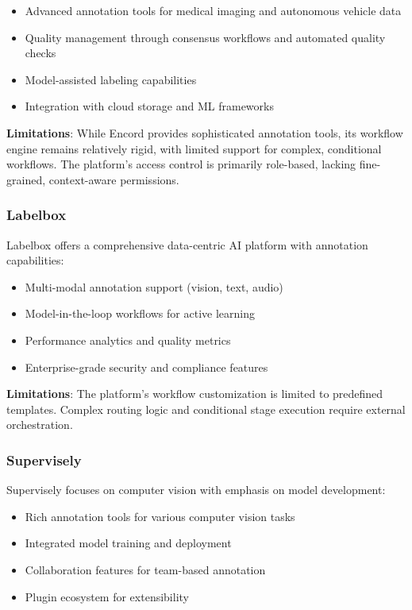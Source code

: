 \begin{itemize}
    \item Advanced annotation tools for medical imaging and autonomous vehicle data
    \item Quality management through consensus workflows and automated quality checks
    \item Model-assisted labeling capabilities
    \item Integration with cloud storage and ML frameworks
\end{itemize}

\textbf{Limitations}: While Encord provides sophisticated annotation tools, its workflow engine remains relatively rigid, with limited support for complex, conditional workflows. The platform's access control is primarily role-based, lacking fine-grained, context-aware permissions.

\subsubsection{Labelbox}

Labelbox \cite{labelbox2023} offers a comprehensive data-centric AI platform with annotation capabilities:

\begin{itemize}
    \item Multi-modal annotation support (vision, text, audio)
    \item Model-in-the-loop workflows for active learning
    \item Performance analytics and quality metrics
    \item Enterprise-grade security and compliance features
\end{itemize}

\textbf{Limitations}: The platform's workflow customization is limited to predefined templates. Complex routing logic and conditional stage execution require external orchestration.

\subsubsection{Supervisely}

Supervisely \cite{supervisely2023} focuses on computer vision with emphasis on model development:

\begin{itemize}
    \item Rich annotation tools for various computer vision tasks
    \item Integrated model training and deployment
    \item Collaboration features for team-based annotation
    \item Plugin ecosystem for extensibility
\end{itemize}

